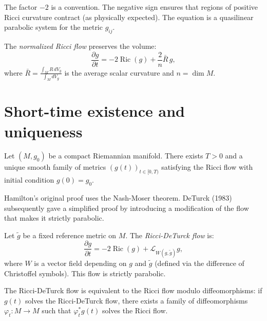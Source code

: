 \begin{remark}
The factor $-2$ is a convention. The negative sign ensures that regions of positive
Ricci curvature contract (as physically expected). The equation is a quasilinear
parabolic system for the metric $g_{ij}$.
\end{remark}

\begin{definition}
The \emph{normalized Ricci flow} preserves the volume:
\[
    \frac{\partial g}{\partial t} = -2\operatorname{Ric}(g) + \frac{2}{n}\bar{R}\, g,
\]
where $\bar{R} = \frac{\int_M R\, dV_g}{\int_M dV_g}$ is the average scalar curvature
and $n = \dim M$.
\end{definition}

\section{Short-time existence and uniqueness}

\begin{theorem}[Hamilton, 1982]
\label{thm:hamilton_existence}
Let $(M, g_0)$ be a compact Riemannian manifold. There exists $T > 0$ and a unique
smooth family of metrics $(g(t))_{t \in [0, T)}$ satisfying the Ricci flow with
initial condition $g(0) = g_0$.
\end{theorem}

\begin{remark}
Hamilton's original proof uses the Nash-Moser theorem. DeTurck (1983) subsequently
gave a simplified proof by introducing a modification of the flow that makes it
strictly parabolic.
\end{remark}

\begin{definition}
Let $\tilde{g}$ be a fixed reference metric on $M$. The \emph{Ricci-DeTurck flow} is:
\[
    \frac{\partial g}{\partial t} = -2\operatorname{Ric}(g)
    + \mathcal{L}_{W(g, \tilde{g})} g,
\]
where $W$ is a vector field depending on $g$ and $\tilde{g}$ (defined via the
difference of Christoffel symbols). This flow is strictly parabolic.
\end{definition}

\begin{proposition}
The Ricci-DeTurck flow is equivalent to the Ricci flow modulo diffeomorphisms:
if $g(t)$ solves the Ricci-DeTurck flow, there exists a family of diffeomorphisms
$\varphi_t : M \to M$ such that $\varphi_t^* g(t)$ solves the Ricci flow.
\end{proposition}


